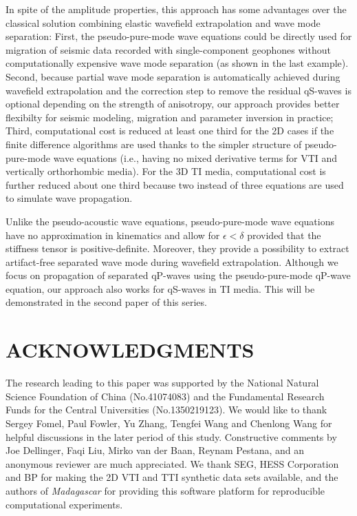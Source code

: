 In spite of the amplitude properties, this approach has some advantages over the classical solution 
combining elastic wavefield extrapolation and wave mode separation:
First, the pseudo-pure-mode wave equations could be directly used for migration of seismic data recorded
with single-component geophones without computationally expensive wave mode separation (as shown in the last example).
Second, because partial wave mode separation is automatically achieved during wavefield extrapolation and the correction step
to remove the residual qS-waves is optional depending on the strength of anisotropy,
	our approach provides better flexibilty for seismic modeling,
   migration and parameter inversion in practice;
Third, computational cost is reduced at least one third for the 2D cases
if the finite difference algorithms are used thanks to the simpler structure of pseudo-pure-mode wave equations
(i.e., having no mixed derivative terms for VTI and vertically orthorhombic media).
For the 3D TI media, computational cost is further reduced about one third because two instead of three
equations are used to simulate wave propagation.

Unlike the pseudo-acoustic wave equations, pseudo-pure-mode wave equations have no approximation in
kinematics and allow for $\epsilon<\delta$ provided that the stiffness tensor is positive-definite.
Moreover, they provide a possibility to extract artifact-free separated wave mode
during wavefield extrapolation.
Although we focus on propagation of separated qP-waves using the pseudo-pure-mode qP-wave equation,
our approach also works for qS-waves in TI media. This will be demonstrated in the second paper of this series.

\section{ACKNOWLEDGMENTS}
The research leading to this paper was supported by the National Natural Science Foundation of China (No.41074083)
and the Fundamental Research Funds for the Central Universities (No.1350219123).
We would like to thank Sergey Fomel, Paul Fowler, Yu Zhang, Tengfei Wang and Chenlong Wang
for helpful discussions in the later period of this study.
Constructive comments by Joe Dellinger, Faqi Liu, Mirko van der Baan, Reynam Pestana, and an anonymous reviewer
are much appreciated. We thank SEG, HESS Corporation and BP for making the 2D VTI and TTI synthetic data sets available,
and the authors of \emph{Madagascar} for providing this
software platform for reproducible computational experiments.

